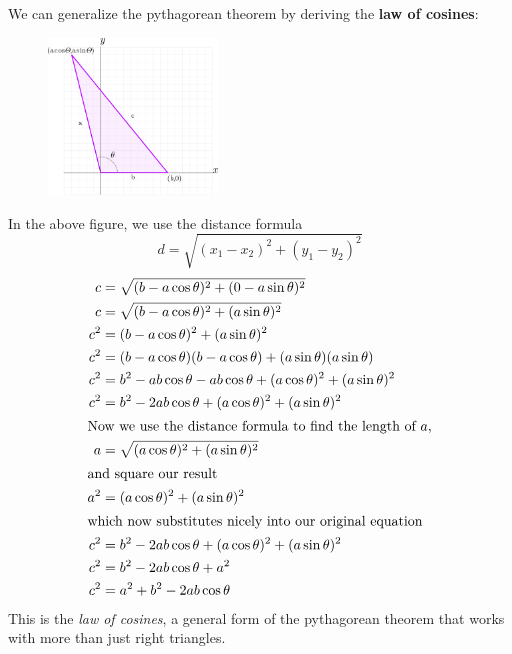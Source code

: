We can generalize the pythagorean theorem by deriving the \textbf{law of cosines}:
\begin{figure}[H]
  \begin{center}
    \includegraphics[width=0.4\textwidth]{continuous/trig/lawcosines}
  \end{center}
\end{figure}
In the above figure, we use the distance formula
\begin{equation}
  d=\sqrt{(x_1 - x_2)^2+(y_1-y_2)^2}
  \label{eq:distance}
\end{equation}
\begin{align}
  \notag  c &= \sqrt{(b-a\cos \theta)^2+(0-a\sin\theta)^2} \\
  \notag  c&=\sqrt{(b-a\cos\theta)^2+(a\sin\theta)^2} \\
  \notag  c^2&=(b-a\cos\theta)^2+(a\sin\theta)^2 \\
  \notag  c^2 &= (b-a\cos\theta)(b-a\cos\theta)+(a\sin\theta)(a\sin\theta) \\
  \notag  c^2 &= b^2 -ab\cos\theta -ab\cos\theta+(a\cos\theta)^2+(a\sin\theta)^2\\
  \notag  c^2&=b^2-2ab\cos\theta+(a\cos\theta)^2+(a\sin\theta)^2\\
  \intertext{Now we use the distance formula to find the length of $a$,}
  \notag  a&=\sqrt{(a\cos\theta)^2+(a\sin\theta)^2}\\
  \intertext{and square our result}
  \notag  a^2&=(a\cos\theta)^2+(a\sin\theta)^2\\
  \intertext{which now substitutes nicely into our original equation}
  \notag  c^2&=b^2-2ab\cos\theta+(a\cos\theta)^2+(a\sin\theta)^2\\
  \notag  c^2&=b^2-2ab\cos\theta+a^2\\
  c^2&=a^2+b^2-2ab\cos\theta
\end{align}
This is the \emph{law of cosines},
a general form of the pythagorean theorem
that works with more than just right triangles.

